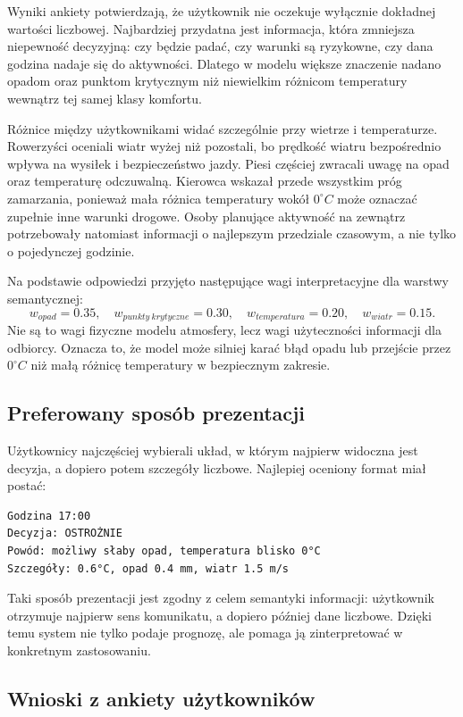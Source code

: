 \documentclass[a4paper,12pt]{article}
\begin{document}
Wyniki ankiety potwierdzają, że użytkownik nie oczekuje wyłącznie dokładnej
wartości liczbowej. Najbardziej przydatna jest informacja, która zmniejsza
niepewność decyzyjną: czy będzie padać, czy warunki są ryzykowne, czy dana
godzina nadaje się do aktywności. Dlatego w modelu większe znaczenie nadano
opadom oraz punktom krytycznym niż niewielkim różnicom temperatury wewnątrz
tej samej klasy komfortu.

Różnice między użytkownikami widać szczególnie przy wietrze i temperaturze.
Rowerzyści oceniali wiatr wyżej niż pozostali, bo prędkość wiatru bezpośrednio
wpływa na wysiłek i bezpieczeństwo jazdy. Piesi częściej zwracali uwagę na
opad oraz temperaturę odczuwalną. Kierowca wskazał przede wszystkim próg
zamarzania, ponieważ mała różnica temperatury wokół \(0^\circ C\) może oznaczać
zupełnie inne warunki drogowe. Osoby planujące aktywność na zewnątrz
potrzebowały natomiast informacji o najlepszym przedziale czasowym, a nie tylko
o pojedynczej godzinie.

Na podstawie odpowiedzi przyjęto następujące wagi interpretacyjne dla warstwy
semantycznej:
\[
w_{opad}=0.35,\quad
w_{punkty\ krytyczne}=0.30,\quad
w_{temperatura}=0.20,\quad
w_{wiatr}=0.15.
\]
Nie są to wagi fizyczne modelu atmosfery, lecz wagi użyteczności informacji dla
odbiorcy. Oznacza to, że model może silniej karać błąd opadu lub przejście
przez \(0^\circ C\) niż małą różnicę temperatury w bezpiecznym zakresie.

\subsection{Preferowany sposób prezentacji}

Użytkownicy najczęściej wybierali układ, w którym najpierw widoczna jest
decyzja, a dopiero potem szczegóły liczbowe. Najlepiej oceniony format miał
postać:
\begin{verbatim}
Godzina 17:00
Decyzja: OSTROŻNIE
Powód: możliwy słaby opad, temperatura blisko 0°C
Szczegóły: 0.6°C, opad 0.4 mm, wiatr 1.5 m/s
\end{verbatim}

Taki sposób prezentacji jest zgodny z celem semantyki informacji: użytkownik
otrzymuje najpierw sens komunikatu, a dopiero później dane liczbowe. Dzięki
temu system nie tylko podaje prognozę, ale pomaga ją zinterpretować w
konkretnym zastosowaniu.

\subsection{Wnioski z ankiety użytkowników}
\end{document}
